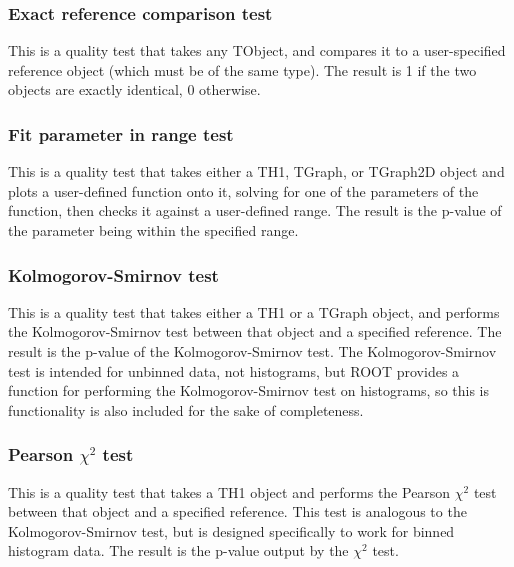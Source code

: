 \subsubsection{Exact reference comparison test}
This is a quality test that takes any TObject, and compares it to a user-specified reference object (which must be of the same type). The result is 1 if the two objects are exactly identical, 0 otherwise. 

\subsubsection{Fit parameter in range test}
This is a quality test that takes either a TH1, TGraph, or TGraph2D object and plots a user-defined function onto it, solving for one of the parameters of the function, then checks it against a user-defined range. The result is the p-value of the parameter being within the specified range.

\subsubsection{Kolmogorov-Smirnov test}
This is a quality test that takes either a TH1 or a TGraph object, and performs the Kolmogorov-Smirnov test between that object and a specified reference. The result is the p-value of the Kolmogorov-Smirnov test. The Kolmogorov-Smirnov test is intended for unbinned data, not histograms, but ROOT provides a function for performing the Kolmogorov-Smirnov test on histograms, so this is functionality is also included for the sake of completeness.

\subsubsection{Pearson $\chi^2$ test}
This is a quality test that takes a TH1 object and performs the Pearson $\chi^2$ test between that object and a specified reference. This test is analogous to the Kolmogorov-Smirnov test, but is designed specifically to work for binned histogram data. The result is the p-value output by the $\chi^2$ test. 


